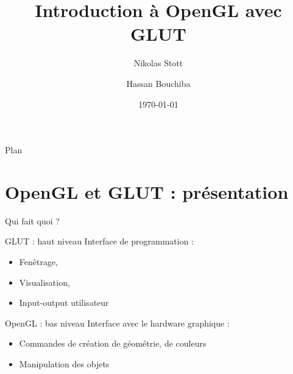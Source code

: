 \documentclass{beamer}
\title{Introduction à OpenGL avec GLUT}
\author[Nikolas Stott]{Nikolas Stott\inst{1} \and Hassan Bouchiba \inst{2}}
\institute[LocalSolver]{\inst{1} LocalSolver \and \inst{2} Terra3d}
\date{\today}
\begin{document}
\begin{frame}
\titlepage
\end{frame}

\begin{frame}{Plan}
\tableofcontents
\end{frame}


\section{OpenGL et GLUT : présentation}
\begin{frame}{Qui fait quoi ?}

 \begin{block}{GLUT : haut niveau}
 Interface de programmation :
 \begin{itemize} 
 \item Fenêtrage, 
 \item Visualisation,
 \item Input-output utilisateur
 \end{itemize}
 \end{block}
 
 \begin{block}{OpenGL : bas niveau}
 Interface avec le hardware graphique :
 \begin{itemize}
 \item Commandes de création de géométrie, de couleurs
 \item Manipulation des objets
 \end{itemize}
 \end{block}

\end{frame}
\end{document}
